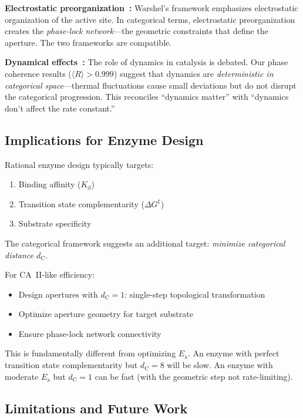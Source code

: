 \documentclass[twocolumn,amsmath,amssymb,aps,prb,superscriptaddress,longbibliography]{revtex4-2}
\newcommand{\dC}{d_{\mathrm{C}}}
\newcommand{\Ea}{E_{\mathrm{a}}}
\newcommand{\DG}{\Delta G^{\ddagger}}
\begin{document}
\textbf{Electrostatic preorganization~\cite{Warshel1998}:} Warshel's framework emphasizes electrostatic organization of the active site. In categorical terms, electrostatic preorganization creates the \emph{phase-lock network}---the geometric constraints that define the aperture. The two frameworks are compatible.

\textbf{Dynamical effects~\cite{Kamerlin2010, Kohen2015}:} The role of dynamics in catalysis is debated. Our phase coherence results ($\langle R \rangle > 0.999$) suggest that dynamics are \emph{deterministic in categorical space}---thermal fluctuations cause small deviations but do not disrupt the categorical progression. This reconciles ``dynamics matter'' with ``dynamics don't affect the rate constant.''

\subsection{Implications for Enzyme Design}

Rational enzyme design typically targets:
\begin{enumerate}
\item Binding affinity ($K_{\text{d}}$)
\item Transition state complementarity ($\DG$)
\item Substrate specificity
\end{enumerate}

The categorical framework suggests an additional target: \emph{minimize categorical distance $\dC$}.

For CA~II-like efficiency:
\begin{itemize}
\item Design apertures with $\dC = 1$: single-step topological transformation
\item Optimize aperture geometry for target substrate
\item Ensure phase-lock network connectivity
\end{itemize}

This is fundamentally different from optimizing $\Ea$. An enzyme with perfect transition state complementarity but $\dC = 8$ will be slow. An enzyme with moderate $\Ea$ but $\dC = 1$ can be fast (with the geometric step not rate-limiting).

\subsection{Limitations and Future Work}
\end{document}

